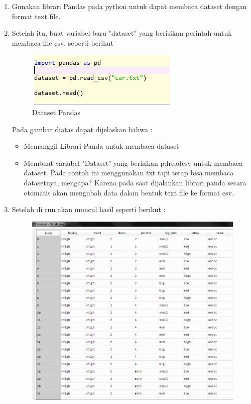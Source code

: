 \begin{enumerate}
\item
Gunakan librari Pandas pada python untuk dapat membaca dataset dengan format text file.
\item
Setelah itu, buat variabel baru "dataset" yang berisikan perintah untuk membaca file csv. seperti berikut
\begin{figure}[ht]
\centering
\includegraphics[scale=0.5]{figures/teori3.png}
\caption{Dataset Pandas}
\label{Contoh}
\end{figure}
\par
Pada gambar diatas dapat dijelaskan bahwa :\\
\begin{itemize}
\item
Memanggil Librari Panda untuk membaca dataset
\item
Membuat variabel "Dataset" yang berisikan pdreadcsv untuk membaca dataset. Pada contoh ini menggunakan txt tapi tetap bisa membaca datasetnya, mengapa? Karena pada saat dijalankan librari panda secara otomatis akan mengubah data dalam bentuk text file ke format csv.
\end{itemize}
\item
Setelah di run akan muncul hasil seperti berikut :
\begin{figure}[ht]
\centering
\includegraphics[scale=0.5]{figures/teori4.png}

\end{figure}
\end{enumerate}
